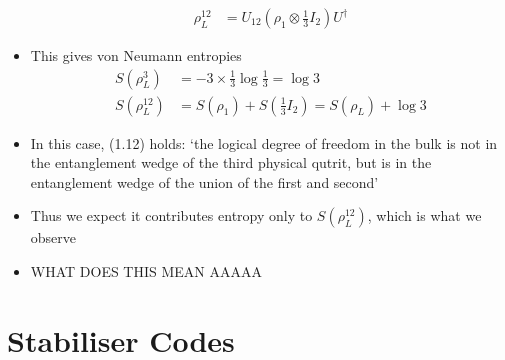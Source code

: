\documentclass[12pt,a4paper]{article}
\numberwithin{equation}{section}
\begin{document}
\begin{itemize}
\begin{equation}
\begin{aligned}
				\rho_{L}^{12}&=U_{12}\left(\rho_{1}\otimes\frac{1}{3}I_{2}\right)U^{\dagger}
			\end{aligned}
		\end{equation}
		\item This gives von Neumann entropies
		\begin{equation}
			\begin{aligned}
				S(\rho_{L}^{3})&=-3\times\frac{1}{3}\log\frac{1}{3}=\log{3}\\
				S(\rho_{L}^{12})&=S(\rho_{1})+S\left(\frac{1}{3}I_{2}\right)=S(\rho_{L})+\log{3}
			\end{aligned}
		\end{equation}
		\item In this case, (1.12) holds: `the logical degree of freedom in the bulk is not in the entanglement wedge of the third physical qutrit, but is in the entanglement wedge of the union of the first and second'
		\item Thus we expect it contributes entropy only to $S(\rho_{L}^{12})$, which is what we observe
		\item WHAT DOES THIS MEAN AAAAA
	\end{itemize}
	\section{Stabiliser Codes}
\end{document}
